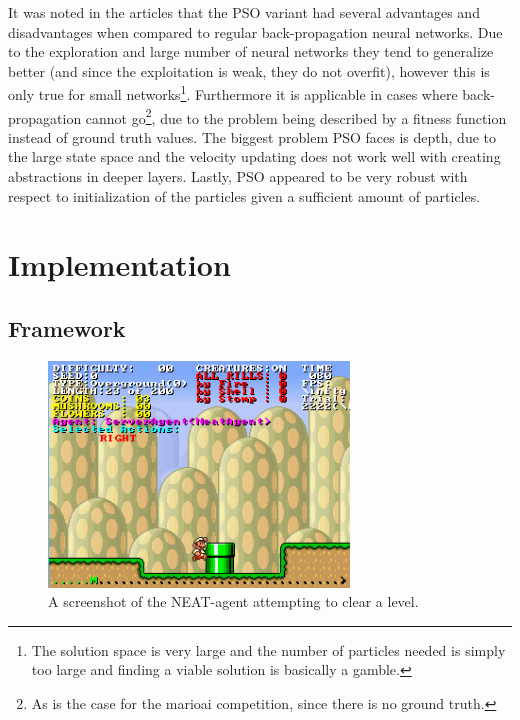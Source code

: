 \documentclass[]{article}
\begin{document}
It was noted in the articles that the PSO variant had several advantages and disadvantages when compared to regular back-propagation neural networks. Due to the exploration and large number of neural networks they tend to generalize better (and since the exploitation is weak, they do not overfit), however this is only true for small networks\footnote{The solution space is very large and the number of particles needed is simply too large and finding a viable solution is basically a gamble.}. Furthermore it is applicable in cases where back-propagation cannot go\footnote{As is the case for the marioai competition, since there is no ground truth.}, due to the problem being described by a fitness function instead of ground truth values. The biggest problem PSO faces is depth, due to the large state space and the velocity updating does not work well with creating abstractions in deeper layers. Lastly, PSO appeared to be very robust with respect to initialization of the particles given a sufficient amount of particles. 

\section{Implementation}
\subsection{Framework}
\label{sec:framework}
\begin{figure}[h]
\centering
\includegraphics[width=8cm]{images/mario-screenshot.png}
\caption{A screenshot of the NEAT-agent attempting to clear a level.}
\label{fig:mario-screenshot}
\end{figure}
\end{document}

